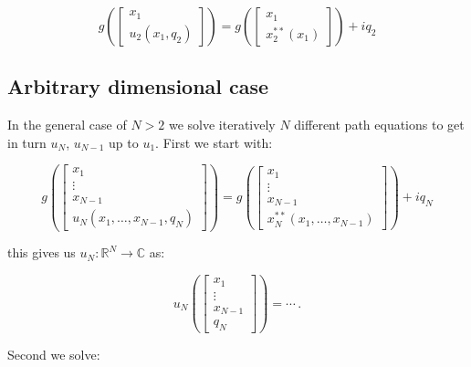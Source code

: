 \documentclass[a4paper,10pt]{article}
\begin{document}
\begin{equation} \label{eq:pequ2}
 g\left(
 \begin{bmatrix}
  x_1 \\ u_2(x_1, q_2)
 \end{bmatrix}
 \right)
 =
 g\left(
 \begin{bmatrix}
  x_1 \\ x_2^{**}(x_1)
 \end{bmatrix}
 \right)
 + i q_2
\end{equation}


\subsection{Arbitrary dimensional case}


In the general case of $N>2$ we solve iteratively $N$ different path equations
to get in turn $u_N$, $u_{N-1}$ up to $u_1$. First we start with:

\begin{equation} \nonumber
 g\left(
 \begin{bmatrix}
  x_1 \\ \vdots \\ x_{N-1} \\ u_N(x_1, \ldots, x_{N-1}, q_N)
 \end{bmatrix}
 \right)
 = g\left(
 \begin{bmatrix}
  x_1 \\ \vdots \\ x_{N-1} \\ x_N^{**}(x_1, \ldots, x_{N-1})
 \end{bmatrix}
 \right)
 +i q_N
\end{equation}

this gives us $u_N:\mathbb{R}^{N} \rightarrow \mathbb{C}$ as:

\begin{equation} \nonumber
 u_N\left(
 \begin{bmatrix}
  x_1 \\ \vdots \\ x_{N-1} \\ q_N
 \end{bmatrix}
 \right) = \cdots \,.
\end{equation}

Second we solve:
\end{document}

